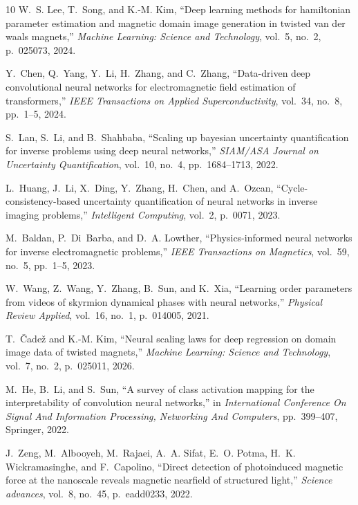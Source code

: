 \documentclass[final,5p,times,twocolumn]{elsarticle}
\begin{document}
\begin{thebibliography}{10}
W.~S. Lee, T.~Song, and K.-M. Kim, ``Deep learning methods for hamiltonian parameter estimation and magnetic domain image generation in twisted van der waals magnets,'' {\em Machine Learning: Science and Technology}, vol.~5, no.~2, p.~025073, 2024.

Y.~Chen, Q.~Yang, Y.~Li, H.~Zhang, and C.~Zhang, ``Data-driven deep convolutional neural networks for electromagnetic field estimation of transformers,'' {\em IEEE Transactions on Applied Superconductivity}, vol.~34, no.~8, pp.~1--5, 2024.

S.~Lan, S.~Li, and B.~Shahbaba, ``Scaling up bayesian uncertainty quantification for inverse problems using deep neural networks,'' {\em SIAM/ASA Journal on Uncertainty Quantification}, vol.~10, no.~4, pp.~1684--1713, 2022.

L.~Huang, J.~Li, X.~Ding, Y.~Zhang, H.~Chen, and A.~Ozcan, ``Cycle-consistency-based uncertainty quantification of neural networks in inverse imaging problems,'' {\em Intelligent Computing}, vol.~2, p.~0071, 2023.

M.~Baldan, P.~Di~Barba, and D.~A. Lowther, ``Physics-informed neural networks for inverse electromagnetic problems,'' {\em IEEE Transactions on Magnetics}, vol.~59, no.~5, pp.~1--5, 2023.

W.~Wang, Z.~Wang, Y.~Zhang, B.~Sun, and K.~Xia, ``Learning order parameters from videos of skyrmion dynamical phases with neural networks,'' {\em Physical Review Applied}, vol.~16, no.~1, p.~014005, 2021.

T.~{\v{C}}ade{\v{z}} and K.-M. Kim, ``Neural scaling laws for deep regression on domain image data of twisted magnets,'' {\em Machine Learning: Science and Technology}, vol.~7, no.~2, p.~025011, 2026.

M.~He, B.~Li, and S.~Sun, ``A survey of class activation mapping for the interpretability of convolution neural networks,'' in {\em International Conference On Signal And Information Processing, Networking And Computers}, pp.~399--407, Springer, 2022.

J.~Zeng, M.~Albooyeh, M.~Rajaei, A.~A. Sifat, E.~O. Potma, H.~K. Wickramasinghe, and F.~Capolino, ``Direct detection of photoinduced magnetic force at the nanoscale reveals magnetic nearfield of structured light,'' {\em Science advances}, vol.~8, no.~45, p.~eadd0233, 2022.


\end{thebibliography}
\end{document}
